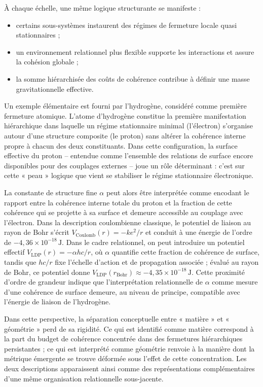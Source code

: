\documentclass[11pt,a4paper]{article}
\begin{document}
À chaque échelle, une même logique structurante se manifeste : 
\begin{itemize}
  \item certains sous-systèmes instaurent des régimes de fermeture locale quasi stationnaires ; 
  \item un environnement relationnel plus flexible supporte les interactions et assure la cohésion globale ; 
  \item la somme hiérarchisée des coûts de cohérence contribue à définir une masse gravitationnelle effective. 
\end{itemize}

Un exemple élémentaire est fourni par l’hydrogène, considéré comme première fermeture atomique. L’atome d’hydrogène constitue la première manifestation hiérarchique dans laquelle un régime stationnaire minimal (l’électron) s’organise autour d’une structure composite (le proton) sans altérer la cohérence interne propre à chacun des deux constituants. Dans cette configuration, la surface effective du proton – entendue comme l’ensemble des relations de surface encore disponibles pour des couplages externes – joue un rôle déterminant : c’est sur cette « peau » logique que vient se stabiliser le régime stationnaire électronique. 

La constante de structure fine \(\alpha\) peut alors être interprétée comme encodant le rapport entre la cohérence interne totale du proton et la fraction de cette cohérence qui se projette à sa surface et demeure accessible au couplage avec l’électron. Dans la description coulombienne classique, le potentiel de liaison au rayon de Bohr s’écrit \(V_{\mathrm{Coulomb}}(r) = -k e^{2}/r\) et conduit à une énergie de l’ordre de \(-4{,}36\times 10^{-18}\,\mathrm{J}\). Dans le cadre relationnel, on peut introduire un potentiel effectif \(V_{\mathrm{LDP}}(r) = -\alpha h c/r\), où \(\alpha\) quantifie cette fraction de cohérence de surface, tandis que \(h c / r\) fixe l’échelle d’action et de propagation associée ; évalué au rayon de Bohr, ce potentiel donne \(V_{\mathrm{LDP}}(r_{\mathrm{Bohr}}) \approx -4{,}35\times 10^{-18}\,\mathrm{J}\). Cette proximité d’ordre de grandeur indique que l’interprétation relationnelle de \(\alpha\) comme mesure d’une cohérence de surface demeure, au niveau de principe, compatible avec l’énergie de liaison de l’hydrogène. 

Dans cette perspective, la séparation conceptuelle entre « matière » et « géométrie » perd de sa rigidité. Ce qui est identifié comme matière correspond à la part du budget de cohérence concentrée dans des fermetures hiérarchiques persistantes ; ce qui est interprété comme géométrie renvoie à la manière dont la métrique émergente se trouve déformée sous l’effet de cette concentration. Les deux descriptions apparaissent ainsi comme des représentations complémentaires d’une même organisation relationnelle sous-jacente.
\end{document}

